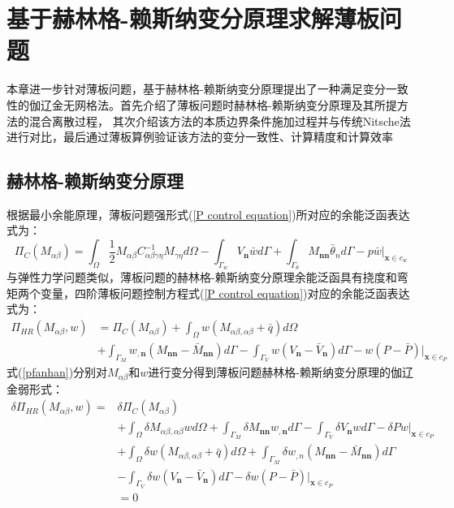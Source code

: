 \chapter{基于赫林格-赖斯纳变分原理求解薄板问题}
本章进一步针对薄板问题，基于赫林格-赖斯纳变分原理提出了一种满足变分一致性的伽辽金无网格法。首先介绍了薄板问题时赫林格-赖斯纳变分原理及其所提方法的混合离散过程，
其次介绍该方法的本质边界条件施加过程并与传统Nitsche法进行对比，最后通过薄板算例验证该方法的变分一致性、计算精度和计算效率
\section{赫林格-赖斯纳变分原理}
根据最小余能原理，薄板问题强形式(\ref{P control equation})所对应的余能泛函表达式为：
\begin{equation}
\Pi_C(M_{\alpha\beta})=\int_{\Omega}\frac{1}{2}M_{\alpha\beta}C^{-1}_{\alpha\beta\gamma\eta}M_{\gamma\eta}d\Omega-\int_{\Gamma_w}V_{\pmb n}\bar{w}d\Gamma+\int_{\Gamma_{\theta}}M_{\pmb{nn}}\bar{\theta}_nd\Gamma-p\bar{w}\vert_{\pmb{x}\in{c_w}}
\end{equation}
与弹性力学问题类似，薄板问题的赫林格-赖斯纳变分原理余能泛函具有挠度和弯矩两个变量，四阶薄板问题控制方程式(\ref{P control equation})对应的余能泛函表达式为：
\begin{equation}\label{pfanhan}
\begin{split}
    \Pi_{H\!R}(M_{\alpha\beta},w)&=\Pi_C(M_{\alpha\beta})+\int_{\Omega}w(M_{\alpha\beta,\alpha\beta}+\bar{q})d\Omega\\
    &+\int_{\Gamma_M}w_{,\pmb n}(M_{\pmb{nn}}-\bar{M}_{\pmb{nn}})d\Gamma
    -\int_{\Gamma_V}w(V_{\pmb n}-\bar{V}_{\pmb n})d\Gamma-w(P-\bar{P})\vert_{\pmb{x}\in{c_P}}
\end{split}
\end{equation}
式(\ref{pfanhan})分别对$M_{\alpha\beta}$和$w$进行变分得到薄板问题赫林格-赖斯纳变分原理的伽辽金弱形式：
\begin{equation}\label{Pweakfrom}
\begin{split}
    \delta\Pi_{H\!R}(M_{\alpha\beta},w)=&\delta\Pi_C(M_{\alpha\beta})\\
    &+\int_{\Omega}\delta M_{\alpha\beta,\alpha\beta}wd\Omega+\int_{\Gamma_M}\delta M_{\pmb{nn}}w_{,\pmb n}d\Gamma-\int_{\Gamma_V}\delta V_{\pmb n}wd\Gamma-\delta Pw\vert_{\pmb{x}\in{c_P}}\\
    &+\int_{\Omega}\delta w(M_{\alpha\beta,\alpha\beta}+\bar{q})d\Omega+\int_{\Gamma_M}\delta w_{,n}(M_{\pmb{nn}}-\bar{M}_{\pmb{nn}})d\Gamma\\
    &-\int_{\Gamma_V}\delta w(V_{\pmb n}-\bar{V}_{\pmb n})d\Gamma-\delta w(P-\bar{P})\vert_{\pmb{x}\in{c_P}}\\
    &=0
\end{split}
\end{equation}\par
